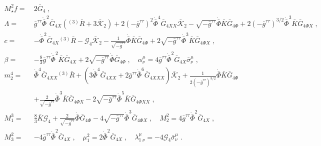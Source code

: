 \documentclass[a4paper,11pt]{article}
\numberwithin{equation}{section}
\begin{document}
\begin{align}
M_\star^2 f = \ &2 \bar{G}_4 \;, \nonumber \\
\Lambda = \ & \bar{g}^{\tau\tau} \dot{\bar{\Phi}}^2 \bar{G}_{4X} ({}^{(3)}\!\bar{R} + 3 \mathcal{\bar{K}}_2) +  2 (-\bar{g}^{\tau\tau})^2 \dot{\bar{\Phi}}^4 \bar{G}_{4XX}\mathcal{\bar{K}}_2 - \sqrt{-\bar{g}^{\tau\tau}} \dot{\bar{\Phi}} \bar{K} \bar{G}_{4\Phi} + 2 (-\bar{g}^{\tau\tau})^{3/2} \dot{\bar{\Phi}}^3 \bar{K} \bar{G}_{4\Phi X}  \;, \nonumber \\
c = \ & -\dot{\bar{\Phi}}^2 \bar{G}_{4X} {}^{(3)}\!\bar{R} - \mathcal{G}_4 \mathcal{\bar{K}}_2- \frac{1}{\sqrt{-\bar{g}^{\tau\tau}}} \dot{\bar{\Phi}} \bar{K} \bar{G}_{4\Phi} + 2 \sqrt{-\bar{g}^{\tau\tau}} \dot{\bar{\Phi}}^3 \bar{K} \bar{G}_{4 \Phi X} \;, \nonumber  \\
\beta = \ & -\frac{8}{3}\bar{g}^{\tau\tau} \dot{\bar{\Phi}}^2 \bar{K} \bar{G}_{4X}  + 2 \sqrt{-\bar{g}^{\tau\tau}} \dot{\bar{\Phi}} \bar{G}_{4\Phi} \;, \quad 
\alpha^\mu_\nu =  4 \bar{g}^{\tau\tau} \dot{\bar{\Phi}}^2 \bar{G}_{4X} \bar{\sigma}^\mu_\nu \;, \nonumber  \\
m_2^4 = \ &\dot{\bar{\Phi}}^4 \bar{G}_{4XX} {}^{(3)}\!\bar{R} + (3 \dot{\bar{\Phi}}^4 \bar{G}_{4XX} + 2 \bar{g}^{\tau\tau} \dot{\bar{\Phi}}^6 \bar{G}_{4 XXX})\mathcal{\bar{K}}_2 + \frac{1}{2 (-\bar{g}^{\tau\tau})^{3/2}} \dot{\bar{\Phi}} \bar{K} \bar{G}_{4\Phi}   \\ 
&+ \frac{2}{\sqrt{-\bar{g}^{\tau\tau}}} \dot{\bar{\Phi}}^3 \bar{K} \bar{G}_{4 \Phi X} - 2 \sqrt{-\bar{g}^{\tau\tau}} \dot{\bar{\Phi}}^5 \bar{K} \bar{G}_{4 \Phi XX} \;, \nonumber \\ 
M_1^3 = \ & \frac{8}{3} \bar{K} \mathcal{G}_4  + \frac{2}{\sqrt{-\bar{g}^{\tau\tau}}} \dot{\bar{\Phi}} \bar{G}_{4\Phi} - 4 \sqrt{-\bar{g}^{\tau\tau}} \dot{\bar{\Phi}}^3 \bar{G}_{4 \Phi X} \;, \quad
M_2^2 = 4 \bar{g}^{\tau\tau} \dot{\bar{\Phi}}^2 \bar{G}_{4X} \;, \nonumber \\
M_3^2 = \ & -4 \bar{g}^{\tau\tau} \dot{\bar{\Phi}}^2 \bar{G}_{4X} \;, \quad
\mu_1^2 = 2\dot{\bar{\Phi}}^2 \bar{G}_{4X} \;, \quad
\lambda^\mu_{1 \ \nu} = -4 \mathcal{G}_4 \bar{\sigma}^\mu_\nu \;. \nonumber
\end{align}
\end{document}
